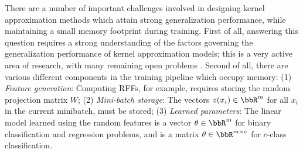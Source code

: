 
There are a number of important challenges involved in designing kernel approximation methods which attain strong generalization performance, while maintaining a small memory footprint during training. First of all, answering this question requires a strong understanding of the factors governing the generalization performance of kernel approximation models; this is a very active area of research, with many remaining open problems \citep{rudi17,avron17,musco17,bach17}. Second of all, there are various different components in the training pipeline which occupy memory: (1) \textit{Feature generation}: Computing RFFs, for example, requires storing the random projection matrix $W$; (2) \textit{Mini-batch storage}: The vectors $z(x_i)\in\RR^m$ for all $x_i$ in the current minibatch, must be stored; (3) \textit{Learned parameters}: The linear model learned using the random features is a vector $\theta \in \RR^m$ for binary classification and regression problems, and is a matrix $\theta \in \RR^{m\times c}$ for $c$-class classification. %

